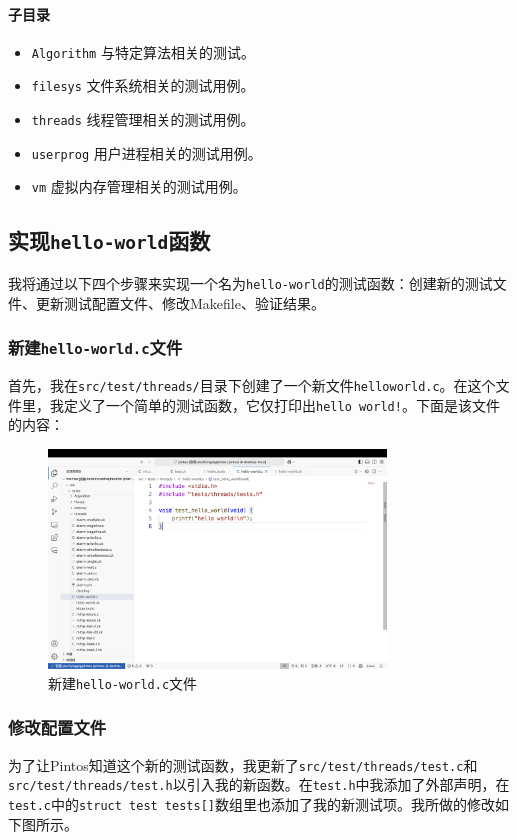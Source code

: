 \documentclass{article}
\begin{document}
\paragraph{子目录}
\begin{itemize}
	\item \texttt{Algorithm} 与特定算法相关的测试。
	\item \texttt{filesys} 文件系统相关的测试用例。
	\item \texttt{threads} 线程管理相关的测试用例。
	\item \texttt{userprog} 用户进程相关的测试用例。
	\item \texttt{vm} 虚拟内存管理相关的测试用例。
\end{itemize}

\subsection{实现\texttt{hello-world}函数}

我将通过以下四个步骤来实现一个名为\texttt{hello-world}的测试函数：创建新的测试文件、更新测试配置文件、修改Makefile、验证结果。

\subsubsection{新建\texttt{hello-world.c}文件}
首先，我在\texttt{src/test/threads/}目录下创建了一个新文件\texttt{helloworld.c}。在这个文件里，我定义了一个简单的测试函数，它仅打印出\texttt{hello world!}。下面是该文件的内容：

\begin{figure}[H]
	\centering
	\includegraphics[width=0.8\textwidth]{img/helloworld.png}
	\caption{新建\texttt{hello-world.c}文件}
\end{figure}

\subsubsection{修改配置文件}
为了让Pintos知道这个新的测试函数，我更新了\texttt{src/test/threads/test.c}和\texttt{src/test/threads/test.h}以引入我的新函数。在\texttt{test.h}中我添加了外部声明，在\texttt{test.c}中的\texttt{struct test tests[]}数组里也添加了我的新测试项。我所做的修改如下图所示。
\end{document}
